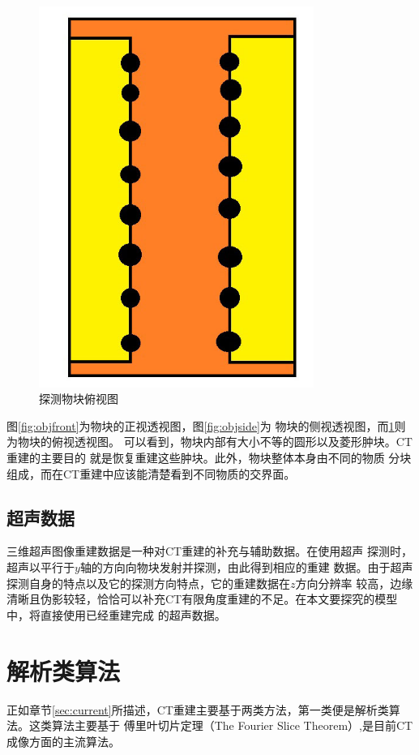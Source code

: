 \begin{figure}[h!]
\center
\includegraphics[width=0.8\textwidth]{figure/object/top}
\caption{探测物块俯视图}\label{fig:objtop}
\end{figure}
图\ref{fig:objfront}为物块的正视透视图，图\ref{fig:objside}为
物块的侧视透视图，而\ref{fig:objtop}则为物块的俯视透视图。
可以看到，物块内部有大小不等的圆形以及菱形肿块。CT重建的主要目的
就是恢复重建这些肿块。此外，物块整体本身由不同的物质
分块组成，而在CT重建中应该能清楚看到不同物质的交界面。

\subsection{超声数据}
三维超声图像重建数据是一种对CT重建的补充与辅助数据。在使用超声
探测时，超声以平行于$y$轴的方向向物块发射并探测，由此得到相应的重建
数据。由于超声探测自身的特点以及它的探测方向特点，它的重建数据在$z$方向分辨率
较高，边缘清晰且伪影较轻，恰恰可以补充CT有限角度重建的不足。在本文要探究的模型中，将直接使用已经重建完成
的超声数据。

\section{解析类算法}
正如章节\ref{sec:current}所描述，CT重建主要基于两类方法，第一类便是解析类算法。这类算法主要基于
傅里叶切片定理（The Fourier Slice Theorem）\cite{bracewell1986fourier},是目前CT成像方面的主流算法。
